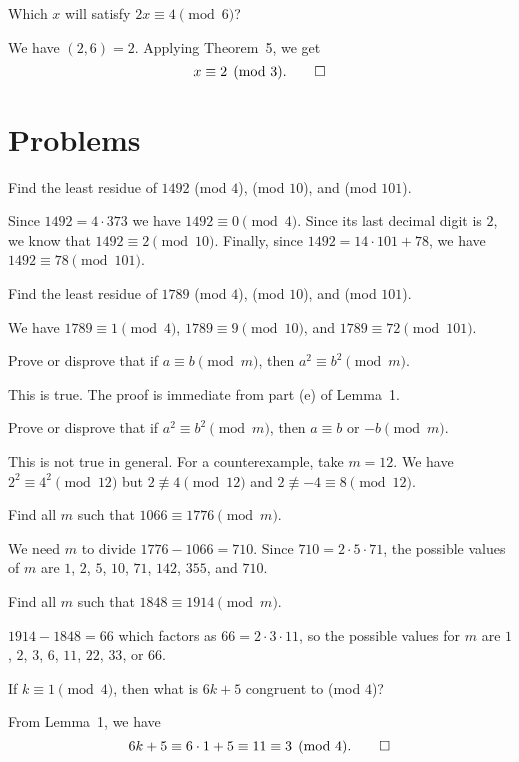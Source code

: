  Which $x$ will satisfy $2x\equiv4\pmod6$?
\begin{solution}
  We have $(2,6) = 2$. Applying Theorem~5, we get
  \begin{equation*}
    x\equiv2\pmod3. \qedhere
  \end{equation*}
\end{solution}

\section{Problems}

 Find the least residue of $1492$ (mod $4$), (mod $10$), and
(mod $101$).
\begin{solution}
  Since $1492 = 4\cdot373$ we have $1492\equiv0\pmod4$. Since its last
  decimal digit is $2$, we know that $1492\equiv2\pmod{10}$. Finally,
  since $1492 = 14\cdot101 + 78$, we have $1492\equiv78\pmod{101}$.
\end{solution}

 Find the least residue of $1789$ (mod $4$), (mod $10$), and
(mod $101$).
\begin{solution}
  We have $1789\equiv1\pmod4$, $1789\equiv9\pmod{10}$, and
  $1789\equiv72\pmod{101}$.
\end{solution}

 Prove or disprove that if $a\equiv b\pmod m$, then
$a^2\equiv b^2\pmod m$.
\begin{solution}
  This is true. The proof is immediate from part (e) of Lemma~1.
\end{solution}

 Prove or disprove that if $a^2\equiv b^2\pmod m$, then
$a\equiv b$ or $-b\pmod m$.
\begin{solution}
  This is not true in general. For a counterexample, take $m = 12$. We
  have $2^2\equiv4^2\pmod{12}$ but $2\not\equiv4\pmod{12}$ and
  $2\not\equiv-4\equiv8\pmod{12}$.
\end{solution}

 Find all $m$ such that $1066\equiv1776\pmod{m}$.
\begin{solution}
  We need $m$ to divide $1776 - 1066 = 710$. Since
  $710 = 2\cdot5\cdot71$, the possible values of $m$ are $1$, $2$,
  $5$, $10$, $71$, $142$, $355$, and $710$.
\end{solution}

 Find all $m$ such that $1848\equiv1914\pmod{m}$.
\begin{solution}
  $1914 - 1848 = 66$ which factors as $66 = 2\cdot3\cdot11$, so the
  possible values for $m$ are $1$, $2$, $3$, $6$, $11$, $22$, $33$, or
  $66$.
\end{solution}

 If $k\equiv1\pmod4$, then what is $6k+5$ congruent to (mod
$4$)?
\begin{solution}
  From Lemma~1, we have
  \begin{equation*}
    6k+5\equiv6\cdot1+5\equiv11\equiv3\pmod4. \qedhere
  \end{equation*}
\end{solution}
